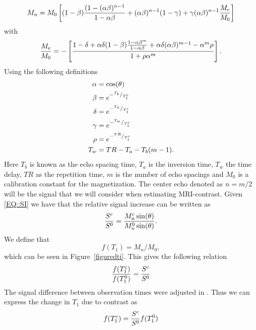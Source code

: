 \documentclass[12pt,a4paper]{article}
\begin{document}
\begin{equation}
M_{n} = M_{0}  \left[ (1-\beta)\frac{(1-(\alpha \beta)\sp{n-1} }{1-\alpha\beta} + (\alpha \beta)\sp{n-1}(1-\gamma) + \gamma ( \alpha \beta)\sp{n-1} \frac{M_{e}}{M_{0}}  \right]   
\end{equation}
with 
\begin{equation}
\frac{M_{e}}{M_{0}} = - \left[ \frac{ 1 -\delta + \alpha \delta (1-\beta ) \frac{1-\alpha\beta\sp{m}}{1-\alpha \beta} + \alpha\delta(\alpha\beta)\sp{m-1} - \alpha\sp{m}\rho}{1 +\rho \alpha\sp{m} } \right].
\end{equation}
Using the following definitions
\begin{equation}
\begin{aligned}
\alpha &= \cos ( \theta ) \\
\beta  &= e\sp{- \sp{T_b}/_{T_1\sp{c}} } \\
\delta &= e\sp{- \sp{T_a}/_{T_1\sp{c}} } \\
\gamma &= e\sp{- \sp{T_w}/_{T_1\sp{c}} } \\
\rho   &= e\sp{- \sp{TR}/_{T_1\sp{c}}}  \\
T_w    &= TR - T_a -T_b(m-1)       .\\
\end{aligned}
\end{equation}
Here $T_b$ is known as the echo spacing time, $T_a$ is the inversion time, $T_w$ the time delay, $TR$ as the repetition time, $m$ is the number of echo spacings and $M_0$ is a calibration constant for the magnetization. The center echo denoted as $n=m/2$ will be the signal that we will consider when estimating MRI-contrast. Given \eqref{EQ::SI} we have that the relative signal increase can be written as 
\begin{equation}
\frac{S\sp{c}}{S\sp{0}} = \frac{ M_{n}\sp{c} \sin (\theta)}{ M_{n}\sp{0} \sin (\theta) }.
\end{equation}
We define that  
\begin{equation}
f(T_1) = M_{n}/M_{0} ,
\label{scaledmagnetization}
\end{equation}
which can be seen in Figure~\ref{figuredti}. 
This gives the following relation 
\begin{equation}
\frac{f(T_{1}\sp{c} ) }{f(T_{1}\sp{0})}  = \frac{S\sp{c}}{S\sp{0}} 
\end{equation}
The signal difference between observation times were adjusted in \cite{ringstad2018brain}. Thus we can express the change in $T_1$ due to contrast as 
\begin{equation}
f ( T_{1}\sp{c} ) = \frac{S\sp{c}}{S\sp{0}} f(T_{1}\sp{0}) 
\end{equation}
\end{document}

